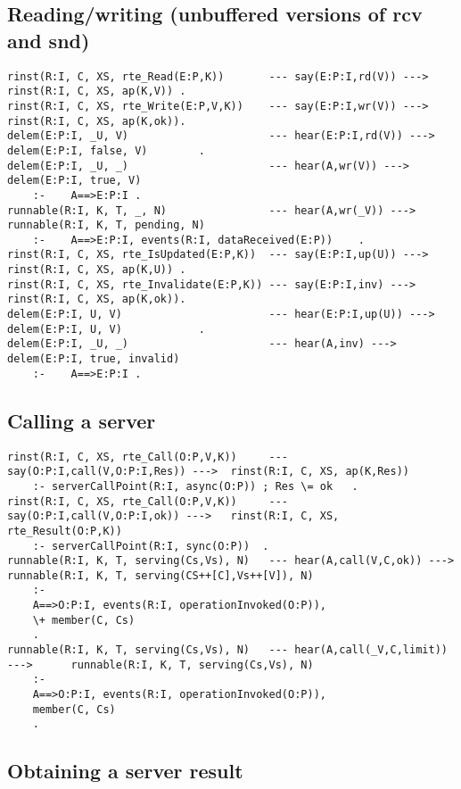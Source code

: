 \subsection{Reading/writing (unbuffered versions of rcv and snd)}

\begin{verbatim}
rinst(R:I, C, XS, rte_Read(E:P,K))       --- say(E:P:I,rd(V)) --->     rinst(R:I, C, XS, ap(K,V)) .
rinst(R:I, C, XS, rte_Write(E:P,V,K))    --- say(E:P:I,wr(V)) --->     rinst(R:I, C, XS, ap(K,ok)).
delem(E:P:I, _U, V)                      --- hear(E:P:I,rd(V)) --->    delem(E:P:I, false, V)        .
delem(E:P:I, _U, _)                      --- hear(A,wr(V)) --->        delem(E:P:I, true, V)
    :-    A==>E:P:I .
runnable(R:I, K, T, _, N)                --- hear(A,wr(_V)) --->       runnable(R:I, K, T, pending, N)
    :-    A==>E:P:I, events(R:I, dataReceived(E:P))    .
rinst(R:I, C, XS, rte_IsUpdated(E:P,K))  --- say(E:P:I,up(U)) --->     rinst(R:I, C, XS, ap(K,U)) .
rinst(R:I, C, XS, rte_Invalidate(E:P,K)) --- say(E:P:I,inv) --->       rinst(R:I, C, XS, ap(K,ok)).
delem(E:P:I, U, V)                       --- hear(E:P:I,up(U)) --->    delem(E:P:I, U, V)            .
delem(E:P:I, _U, _)                      --- hear(A,inv) --->          delem(E:P:I, true, invalid)
    :-    A==>E:P:I .
\end{verbatim}

\subsection{Calling a server}

\begin{verbatim}
rinst(R:I, C, XS, rte_Call(O:P,V,K))     --- say(O:P:I,call(V,O:P:I,Res)) --->  rinst(R:I, C, XS, ap(K,Res))
    :- serverCallPoint(R:I, async(O:P)) ; Res \= ok   .
rinst(R:I, C, XS, rte_Call(O:P,V,K))     --- say(O:P:I,call(V,O:P:I,ok)) --->   rinst(R:I, C, XS, rte_Result(O:P,K))
    :- serverCallPoint(R:I, sync(O:P))  .
runnable(R:I, K, T, serving(Cs,Vs), N)   --- hear(A,call(V,C,ok)) --->          runnable(R:I, K, T, serving(CS++[C],Vs++[V]), N)
    :-
    A==>O:P:I, events(R:I, operationInvoked(O:P)),
    \+ member(C, Cs)
    .
runnable(R:I, K, T, serving(Cs,Vs), N)   --- hear(A,call(_V,C,limit)) --->      runnable(R:I, K, T, serving(Cs,Vs), N)
    :-
    A==>O:P:I, events(R:I, operationInvoked(O:P)),
    member(C, Cs)
    .
\end{verbatim}

\subsection{Obtaining a server result}

